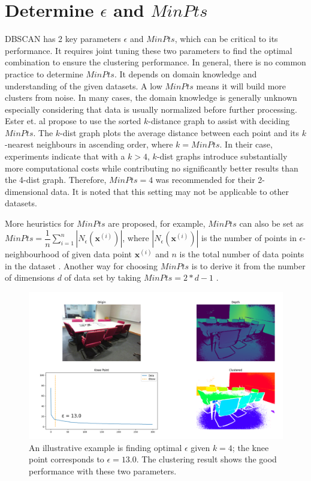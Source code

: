 \section{Determine $\epsilon$ and $MinPts$}

DBSCAN has 2 key parameters $\epsilon$ and $MinPts$, which can be critical to its performance. It requires joint tuning 
these two parameters to find 
the optimal combination to ensure the clustering performance. In general, 
there is no common practice to determine 
$MinPts$. It depends on domain knowledge and understanding of the given datasets. 
A low $MinPts$ means it will build more clusters from noise. In many cases, the 
domain knowledge is generally unknown especially considering that data is usually normalized 
before further processing. Ester et. al 
\cite{ester1996density} propose to use the sorted $k$-distance graph to assist with 
deciding $MinPts$. The $k$-dist graph plots the average distance between each point and its $k$-nearest neighbours in ascending order, where $k=MinPts$. In their case, experiments indicate that with a  $k > 4$,  $k$-dist graphs introduce substantially more computational costs while contributing no significantly better results than the 4-dist graph.
Therefore, $MinPts = 4$ was recommended for their 2-dimensional data. It is noted that this setting may not be applicable to other datasets. 


More heuristics for $MinPts$ are proposed, 
for example, $MinPts$ can also be set as $MinPts = 
\dfrac{1}{n}\sum_{i=1}^{n}|N_{\epsilon}(\mathbf{x}^{(i)})|$, where 
$|N_{\epsilon}(\mathbf{x}^{(i)})|$ is the number of points in 
$\epsilon$-neighbourhood of given data point $\mathbf{x}^{(i)}$ and $n$ is the 
total number of data points in the dataset
\cite{sawant2014adaptive}. Another way for choosing $MinPts$ is to derive it 
from the number of dimensions $d$ of data set by taking $MinPts = 2 * d - 1$ 
\cite{sander1998density}. 

\begin{figure}
	\centering
	\includegraphics[width=\textwidth]{"Part 3 - Learning Systems/Unsupervised Learning/DBScan/figures/para.png"}
	\caption{An illustrative example is finding optimal $\epsilon$ given $k = 
	4$; the knee point corresponds to $\epsilon = 13.0$. The clustering result 
	shows the good performance with these two parameters.}
	\label{fig:para}	
\end{figure}


